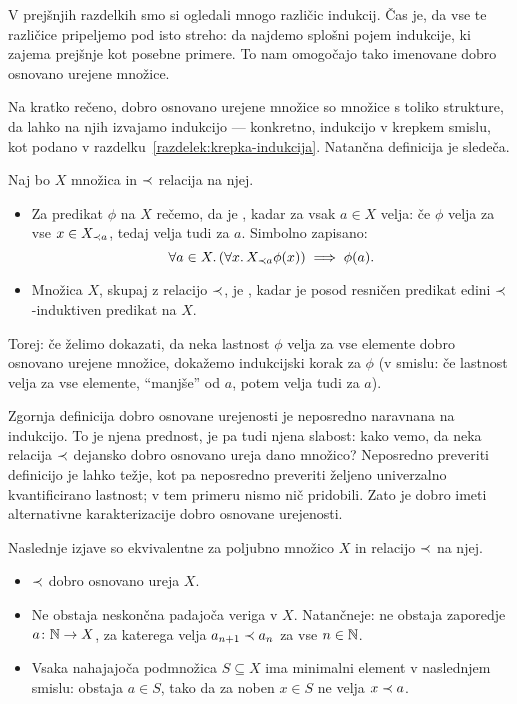 V prejšnjih razdelkih smo si ogledali mnogo različic indukcij. Čas je, da vse te različice pripeljemo pod isto streho: da najdemo splošni pojem indukcije, ki zajema prejšnje kot posebne primere. To nam omogočajo tako imenovane dobro osnovano urejene množice.

Na kratko rečeno, dobro osnovano urejene množice so množice s toliko strukture, da lahko na njih izvajamo indukcijo --- konkretno, indukcijo v krepkem smislu, kot podano v razdelku~\ref{razdelek:krepka-indukcija}. Natančna definicija je sledeča.

\begin{definicija}
        Naj bo $X$ množica in $\prec$ relacija na njej.
        \begin{itemize}
                \item
                        Za predikat $\phi$ na $X$ rečemo, da je , kadar za vsak $a \in X$ velja: če $\phi$ velja za vse $x \in X_{\prec a}$, tedaj velja tudi za $a$. Simbolno zapisano:
                        \[\forall a \in X .\, (\forall x .\, X_{\prec a} \phi(x)) \implies \phi(a).\]
                \item
                        Množica $X$, skupaj z relacijo $\prec$, je , kadar je posod resničen predikat edini $\prec$-induktiven predikat na $X$.
        \end{itemize}
\end{definicija}

Torej: če želimo dokazati, da neka lastnost $\phi$ velja za vse elemente dobro osnovano urejene množice, dokažemo indukcijski korak za $\phi$ (v smislu: če lastnost velja za vse elemente, ``manjše'' od $a$, potem velja tudi za $a$).

Zgornja definicija dobro osnovane urejenosti je neposredno naravnana na indukcijo. To je njena prednost, je pa tudi njena slabost: kako vemo, da neka relacija $\prec$ dejansko dobro osnovano ureja dano množico? Neposredno preveriti definicijo je lahko težje, kot pa neposredno preveriti željeno univerzalno kvantificirano lastnost; v tem primeru nismo nič pridobili. Zato je dobro imeti alternativne karakterizacije dobro osnovane urejenosti.

\begin{izrek}
        Naslednje izjave so ekvivalentne za poljubno množico $X$ in relacijo $\prec$ na njej.
        \begin{itemize}
                \item
                        $\prec$ dobro osnovano ureja $X$.
                \item
                        Ne obstaja neskončna padajoča veriga v $X$. Natančneje: ne obstaja zaporedje $a\colon \mathbb{N} \to X$, za katerega velja $a_{n+1} \prec a_n$ za vse $n \in \mathbb{N}$.
                \item
                        Vsaka nahajajoča podmnožica $S \subseteq X$ ima minimalni element v naslednjem smislu: obstaja $a \in S$, tako da za noben $x \in S$ ne velja $x \prec a$.
        \end{itemize}
\end{izrek}

